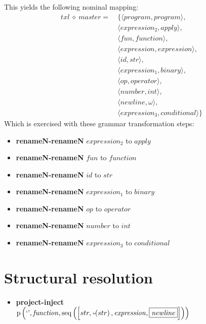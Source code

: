 This yields the following nominal mapping:
\begin{align*}\mathit{txl} \:\diamond\: \mathit{master} =\:& \{\langle \mathit{program},\mathit{program}\rangle,\\
 & \langle \mathit{expression_2},\mathit{apply}\rangle,\\
 & \langle \mathit{fun},\mathit{function}\rangle,\\
 & \langle \mathit{expression},\mathit{expression}\rangle,\\
 & \langle \mathit{id},str\rangle,\\
 & \langle \mathit{expression_1},\mathit{binary}\rangle,\\
 & \langle \mathit{op},\mathit{operator}\rangle,\\
 & \langle \mathit{number},int\rangle,\\
 & \langle \mathit{newline},\omega\rangle,\\
 & \langle \mathit{expression_3},\mathit{conditional}\rangle\}\end{align*}
 Which is exercised with these grammar transformation steps:

{\footnotesize\begin{itemize}
\item \textbf{renameN-renameN} $\mathit{expression_2}$ to $\mathit{apply}$
\item \textbf{renameN-renameN} $\mathit{fun}$ to $\mathit{function}$
\item \textbf{renameN-renameN} $\mathit{id}$ to $str$
\item \textbf{renameN-renameN} $\mathit{expression_1}$ to $\mathit{binary}$
\item \textbf{renameN-renameN} $\mathit{op}$ to $\mathit{operator}$
\item \textbf{renameN-renameN} $\mathit{number}$ to $int$
\item \textbf{renameN-renameN} $\mathit{expression_3}$ to $\mathit{conditional}$
\end{itemize}}

\section{Structural resolution}
{\footnotesize\begin{itemize}
\item \textbf{project-inject}\\$\mathrm{p}\left(\text{`'},\mathit{function},\mathrm{seq}\left(\left[str, \plus \left(str\right), \mathit{expression}, \fbox{$\mathit{newline}$}\right]\right)\right)$
\end{itemize}}
